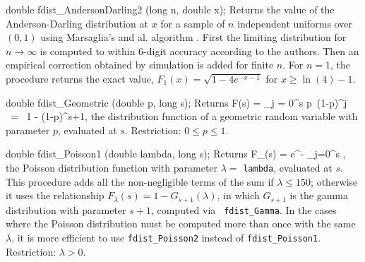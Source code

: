 double fdist_AndersonDarling2 (long n, double x);
\endcode
 \tab Returns the value of the Anderson-Darling distribution at $x$
  for a sample of $n$ independent uniforms over $(0,1)$ using Marsaglia's
  and al. algorithm \cite{tMAR04a}. First the limiting distribution
  for $n\to\infty$ is computed to within 6-digit accuracy according to the
  authors. Then an empirical correction obtained by simulation is added
  for finite $n$.
  For $n=1$, the procedure returns the exact value,
  $F_1(x) = \sqrt{1 - 4e^{-x-1}}$ for $x\ge \ln(4) - 1$.
 \endtab




\code

double fdist_Geometric (double p, long s);
\endcode
  \tab Returns
  \eq
   F(s) = \sum_{j = 0}^s p\, (1-p)^{j} ~=~ 1 - (1-p)^{s+1},
  \endeq
  the distribution function of a geometric random variable with
  parameter $p$, evaluated at $s$.
  Restriction: $0 \le p \le 1$.
 \endtab
\code


double fdist_Poisson1 (double lambda, long s);
\endcode
  \tab  Returns
  \eq
    F_\lambda(s) =  e^{-\lambda} \sum_{j=0}^s\; ,
  \endeq
  the Poisson distribution function 
  with parameter $\lambda =$ {\tt lambda}, evaluated at $s$.
\ifdetailed
  This procedure adds all the non-negligible terms of the sum
  if $\lambda \le 150$; otherwise it uses the relationship
  $F_\lambda(s) = 1 - G_{s + 1}(\lambda)$, in which $G_{s+1}$ is the
  gamma distribution with parameter $s+1$, computed via {\tt
  fdist\_Gamma}.
\fi
  In the cases where the Poisson distribution must be computed more than
  once with the same $\lambda$, %
  it is more efficient to use 
  {\tt fdist\_Poisson2} instead of {\tt fdist\_Poisson1}.
  Restriction: $\lambda > 0$.
 \endtab
\code



